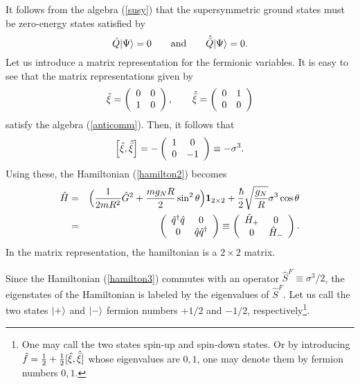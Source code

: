 \documentclass[a4paper,12pt]{article}
\begin{document}
It follows from the algebra (\ref{susy}) that
the supersymmetric ground states must be zero-energy states 
satisfied by
\begin{equation}
\hat Q |{\Psi}\rangle=0\qquad{\rm and}\qquad  \hat{\bar Q}|{\Psi}\rangle=0.
\label{ground1}
\end{equation}
Let us introduce a matrix representation for the fermionic variables.
It is easy to see that the matrix representations given by 
\begin{equation}
\hat\xi=\left(\begin{array}{cc}
0&0\\
1&0\end{array}\right),\qquad
\hat{\bar\xi}=\left(\begin{array}{cc}
0&1\\
0&0\end{array}\right)
\label{supercharge2}
\end{equation}
satisfy the algebra (\ref{anticomm}). Then, it follows that
$$
\Bigl[\hat\xi, \hat{\bar\xi} \Bigr]=-\left(\begin{array}{cc}
1&0\\
0&-1\end{array}\right)\equiv -\sigma^3.
$$
Using these, the 
Hamiltonian (\ref{hamilton2}) becomes
\begin{eqnarray}
\hat H&=& \Bigl({1\over {2mR^2}}\hg^2+{{mg_NR}\over 2}\sin^2\theta\Bigr)
{\bf 1}_{2\times 2}+{\hbar\over 2}\sqrt{{g_N\over R}}\sigma^3\cos\theta
\nonumber\\
&=&\left(\begin{array}{cc}
{\hat q}^{\dagger}{\hat q}&0\\
0&{\hat q}{\hat q}^{\dagger}\end{array}\right)\equiv 
\left(\begin{array}{cc}
{\hat H}_{+}&0\\
0&{\hat H}_{-}\end{array}\right).
\label{hamilton3} 
\end{eqnarray}
In the matrix representation, the 
hamiltonian is a $2\times 2$ matrix. 
\par
Since the Hamiltonian (\ref{hamilton3}) commutes with an  
operator ${\hat S}^{F}\equiv \sigma^3/2$, the eigenstates 
of the Hamiltonian is labeled by the eigenvalues of ${\hat S}^F$. 
Let us call the two states
$|{+}\rangle$ and $|{-}\rangle$ fermion 
numbers $+1/2$ and $-1/2$, respectively\footnote{One may call 
the two states spin-up and spin-down states. Or by 
introducing ${\hat f}={1\over2}+{1\over2}[\hat\xi, \hat{\bar\xi}]$
whose eigenvalues are $0, 1$, one may denote them by fermion 
numbers $0, 1$.}. 
\end{document}
